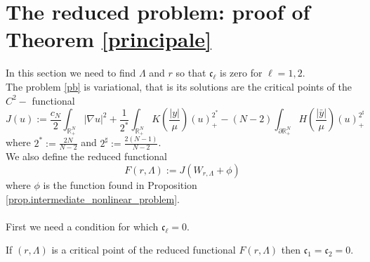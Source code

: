 \documentclass[11pt,a4paper]{amsart}
\begin{document}
\section{The reduced problem: proof of Theorem \ref{principale}}\label{ridotto}
In this section we need to find $\Lambda$ and $r$ so that $\mathfrak c_\ell$ is zero for $\ell=1, 2$. \\
The problem \eqref{pb} is variational, that is its solutions are the critical points of the $C^2-$ functional $$J(u):=\frac{c_N}{2}\int_{\mathbb R^N_+}|\nabla u|^2+\frac{1}{2^*}\int_{\mathbb R^N_+} K\left(\frac{|y|}{\mu}\right)(u)^{2^*}_+-(N-2)\int_{\partial \mathbb R^N_+}H\left(\frac{|\bar y|}{\mu}\right)(u)^{2^\sharp}_+$$ where $2^*:=\frac{2N}{N-2}$ and $2^\sharp:=\frac{2(N-1)}{N-2}$.\\
We also define the reduced functional
$$F(r, \Lambda):=J(W_{r, \Lambda}+\phi)$$ where $\phi$ is the function found in Proposition \ref{prop.intermediate_nonlinear_problem}.\\\\
First we need a condition for which $\mathfrak c_\ell=0$.
\begin{proposition}
If $(r, \Lambda)$ is a critical point of the reduced functional $F(r, \Lambda)$ then $\mathfrak c_1=\mathfrak c_2=0$.
\end{proposition}
\end{document}
